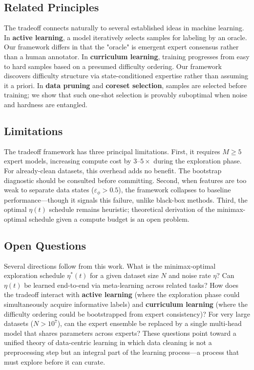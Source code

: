\subsection*{Related Principles}

The tradeoff connects naturally to several established ideas in machine learning. In \textbf{active learning}, a model iteratively selects samples for labeling by an oracle. Our framework differs in that the "oracle" is emergent expert consensus rather than a human annotator. In \textbf{curriculum learning}, training progresses from easy to hard samples based on a presumed difficulty ordering. Our framework discovers difficulty structure via state-conditioned expertise rather than assuming it a priori. In \textbf{data pruning} and \textbf{coreset selection}, samples are selected before training; we show that such one-shot selection is provably suboptimal when noise and hardness are entangled.

\subsection*{Limitations}

The tradeoff framework has three principal limitations. First, it requires $M \geq 5$ expert models, increasing compute cost by $3$--$5\times$ during the exploration phase. For already-clean datasets, this overhead adds no benefit. The bootstrap diagnostic should be consulted before committing. Second, when features are too weak to separate data states ($\varepsilon_\phi > 0.5$), the framework collapses to baseline performance---though it signals this failure, unlike black-box methods. Third, the optimal $\eta(t)$ schedule remains heuristic; theoretical derivation of the minimax-optimal schedule given a compute budget is an open problem.

\subsection*{Open Questions}

Several directions follow from this work. What is the minimax-optimal exploration schedule $\eta^*(t)$ for a given dataset size $N$ and noise rate $\eta$? Can $\eta(t)$ be learned end-to-end via meta-learning across related tasks? How does the tradeoff interact with \textbf{active learning} (where the exploration phase could simultaneously acquire informative labels) and \textbf{curriculum learning} (where the difficulty ordering could be bootstrapped from expert consistency)? For very large datasets ($N > 10^7$), can the expert ensemble be replaced by a single multi-head model that shares parameters across experts? These questions point toward a unified theory of data-centric learning in which data cleaning is not a preprocessing step but an integral part of the learning process---a process that must explore before it can curate.

